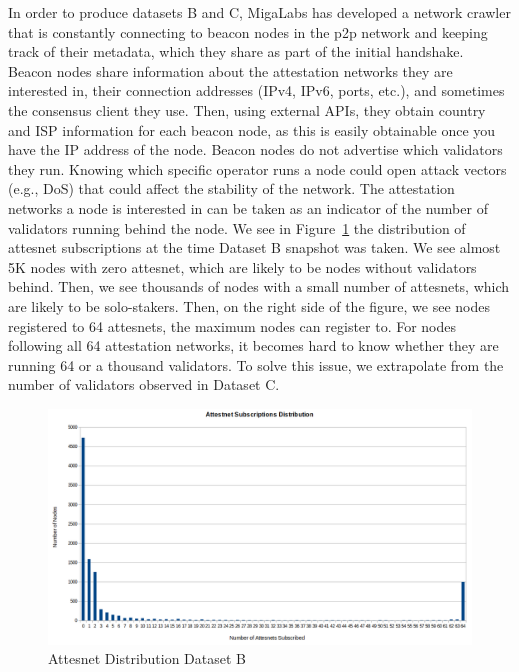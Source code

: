 \documentclass[conference]{IEEEtran}
\begin{document}
In order to produce datasets B and C, MigaLabs has developed a network crawler that is constantly connecting to beacon nodes in the p2p network and keeping track of their metadata, which they share as part of the initial handshake. Beacon nodes share information about the attestation networks they are interested in, their connection addresses (IPv4, IPv6, ports, etc.), and sometimes the consensus client they use. Then, using external APIs, they obtain country and ISP information for each beacon node, as this is easily obtainable once you have the IP address of the node. Beacon nodes do not advertise which validators they run. Knowing which specific operator runs a node could open attack vectors (e.g., DoS) that could affect the stability of the network. The attestation networks a node is interested in can be taken as an indicator of the number of validators running behind the node. We see in Figure~\ref{fig:attesnets} the distribution of attesnet subscriptions at the time Dataset B snapshot was taken. We see almost 5K nodes with zero attesnet, which are likely to be nodes without validators behind. Then, we see thousands of nodes with a small number of attesnets, which are likely to be solo-stakers. Then, on the right side of the figure, we see nodes registered to 64 attesnets, the maximum nodes can register to. For nodes following all 64 attestation networks, it becomes hard to know whether they are running 64 or a thousand validators. To solve this issue, we extrapolate from the number of validators observed in Dataset C.

\begin{figure}
    \centering
    \includegraphics[width=0.95\linewidth]{figures/attesnets.png}
    \caption{Attesnet Distribution Dataset B}
    \label{fig:attesnets}
\end{figure}
\end{document}

